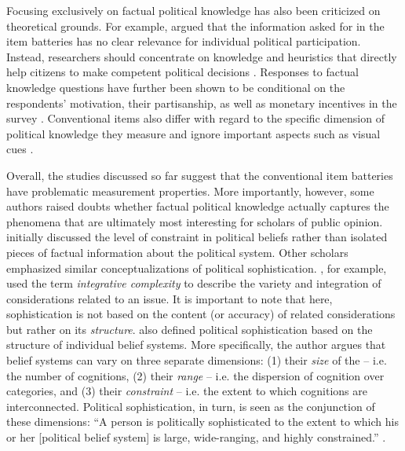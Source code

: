 \documentclass[12pt]{article}
\begin{document}
Focusing exclusively on factual political knowledge has also been criticized on theoretical grounds. For example, \citet{lupia2006elitism} argued that the information asked for in the item batteries has no clear relevance for individual political participation. Instead, researchers should concentrate on knowledge and heuristics that directly help citizens to make competent political decisions \citep[see also][]{lupia1994shortcuts}. Responses to factual knowledge questions have further been shown to be conditional on the respondents' motivation, their partisanship, as well as monetary incentives in the survey \citep{prior2008money,bullock2015partisan,prior2015you}. Conventional items also differ with regard to the specific dimension of political knowledge they measure \citep{barabas2014question} and ignore important aspects such as visual cues \citep{prior2014visual}.

Overall, the studies discussed so far suggest that the conventional item batteries have problematic measurement properties. More importantly, however, some authors raised doubts whether factual political knowledge actually captures the phenomena that are ultimately most interesting for scholars of public opinion. \citet{converse1964nature} initially discussed the level of constraint in political beliefs rather than isolated pieces of factual information about the political system. Other scholars emphasized similar conceptualizations of political sophistication. \citet{tetlock1983cognitive}, for example, used the term \textit{integrative complexity} to describe the variety and integration of considerations related to an issue. It is important to note that here, sophistication is not based on the content (or accuracy) of related considerations but rather on its \textit{structure}. \citet{luskin1987measuring} also defined political sophistication based on the structure of individual belief systems. More specifically, the author argues that belief systems can vary on three separate dimensions: (1) their \textit{size} of the -- i.e. the number of cognitions, (2) their \textit{range} -- i.e. the dispersion of cognition over categories, and (3) their \textit{constraint} -- i.e. the extent to which cognitions are interconnected. Political sophistication, in turn, is seen as the conjunction of these dimensions: ``A person is politically sophisticated to the extent to which his or her [political belief system] is large, wide-ranging, and highly constrained.'' \citep[860]{luskin1987measuring}.
\end{document}
